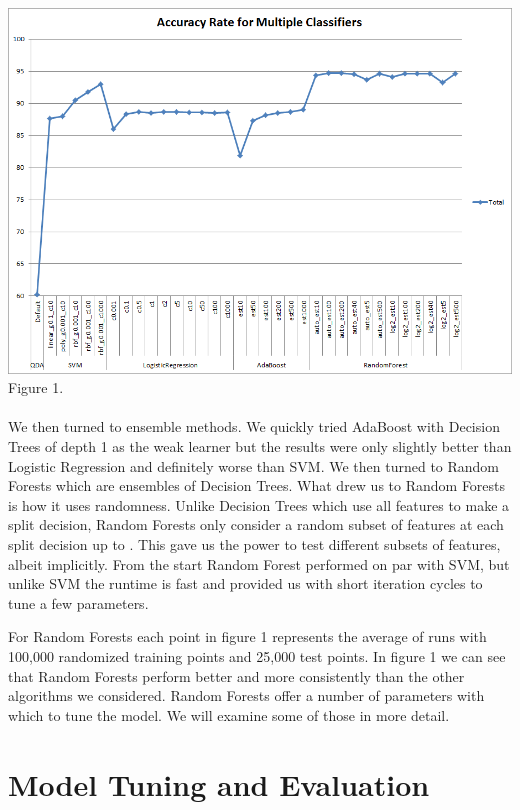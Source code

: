 \documentclass[twoside,11pt]{homework}
\begin{document}
\includegraphics[scale=0.5]{classifiers.png}
\\
Figure 1.
\\
\\
We then turned to ensemble methods. We quickly tried AdaBoost with Decision 
Trees of depth 1 as the weak learner but the results were only slightly better than 
Logistic Regression and definitely worse than SVM. We then turned to Random 
Forests which are ensembles of Decision Trees. What drew us to Random Forests is 
how it uses randomness. Unlike Decision Trees which use all features to make a split 
decision, Random Forests only consider a random subset of features at each split decision up to .
This gave us the power to test different subsets of features, albeit implicitly. From the start Random 
Forest performed on par with SVM, but unlike SVM the runtime is fast and provided 
us with short iteration cycles to tune a few parameters. 

For Random Forests each point in figure 1 represents the average of runs with 100,000 randomized 
training points and 25,000 test points. In figure 1 we can see that Random Forests perform better and more
consistently than the other algorithms we considered. Random Forests offer a number of parameters with which 
to tune the model. We will examine some of those in more detail. 

\section*{Model Tuning and Evaluation}
\end{document}
